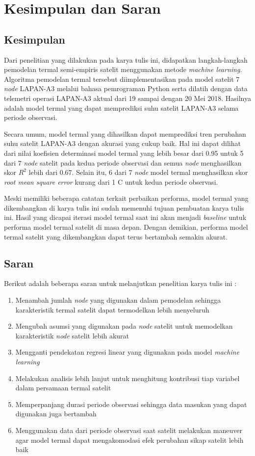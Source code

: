 \chapter{Kesimpulan dan Saran}

\section{Kesimpulan}

Dari penelitian yang dilakukan pada karya tulis ini, didapatkan langkah-langkah
pemodelan termal semi-empiris satelit menggunakan metode \textit{machine
learning}. Algoritma pemodelan termal tersebut diimplementasikan pada model
satelit 7 \textit{node} LAPAN-A3 melalui bahasa pemrograman Python serta
dilatih dengan data telemetri operasi LAPAN-A3 aktual dari 19 sampai dengan 20
Mei 2018. Hasilnya adalah model termal yang dapat memprediksi suhu satelit
LAPAN-A3 selama periode observasi.

Secara umum, model termal yang dihasilkan dapat memprediksi tren perubahan suhu
satelit LAPAN-A3 dengan akurasi yang cukup baik. Hal ini dapat dilihat dari
nilai koefisien determinasi model termal yang lebih besar dari 0.95 untuk 5
dari 7 \textit{node} satelit pada kedua periode observasi dan semua
\textit{node} menghasilkan skor $R^2$ lebih dari 0.67. Selain itu, 6 dari 7
\textit{node} model termal menghasilkan skor \textit{root mean square error}
kurang dari 1 \degree C untuk kedua periode observasi.

Meski memiliki beberapa catatan terkait perbaikan performa, model termal yang
dikembangkan di karya tulis ini sudah memenuhi tujuan pembuatan karya tulis
ini. Hasil yang dicapai iterasi model termal saat ini akan menjadi
\textit{baseline} untuk performa model termal satelit di masa depan. Dengan
demikian, performa model termal satelit yang dikembangkan dapat terus bertambah
semakin akurat.

\section{Saran}

Berikut adalah beberapa saran untuk melanjutkan penelitian karya tulis ini :

\begin{enumerate}
\item Menambah jumlah \textit{node} yang digunakan dalam pemodelan sehingga karakteristik termal satelit dapat termodelkan lebih menyeluruh
\item Mengubah asumsi yang digunakan pada \textit{node} satelit untuk memodelkan karakteristik \textit{node} satelit lebih akurat
\item Mengganti pendekatan regresi linear yang digunakan pada model \textit{machine learning}
\item Melakukan analisis lebih lanjut untuk menghitung kontribusi tiap variabel dalam persamaan termal satelit
\item Memperpanjang durasi periode observasi sehingga data masukan yang dapat digunakan juga bertambah
\item Menggunakan data dari periode observasi saat satelit melakukan maneuver agar model termal dapat mengakomodasi efek perubahan sikap satelit lebih baik
\end{enumerate}
